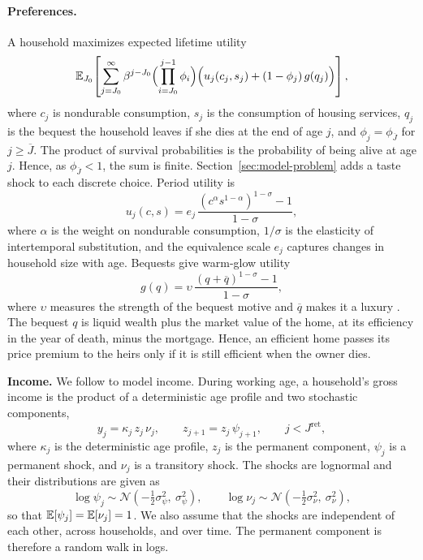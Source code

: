 \paragraph{Preferences.}
A household maximizes expected lifetime utility
\begin{equation}
  \mathbb E_{J_0}\!\left[\sum_{j=J_0}^{\infty}\beta^{j-J_0}
    \Bigl(\prod_{i=J_0}^{j-1}\phi_i\Bigr)
    \Bigl(u_j(c_j,s_j)+(1-\phi_j)\,g(q_j)\Bigr)\right],
  \label{eq:lifetime-utility}
\end{equation}
where $c_j$ is nondurable consumption, $s_j$ is the consumption of housing
services, $q_j$ is the bequest the household leaves if she dies at the end
of age $j$, and $\phi_j=\phi_{\overline J}$ for $j\geq \overline J$.  The product of survival
probabilities is the probability of being alive at age $j$. Hence, as
$\phi_{\overline J}<1$, the sum is finite. Section~\ref{sec:model-problem} adds
a taste shock to each discrete choice. Period utility is
\begin{equation}
  u_j(c,s)=e_j\,\frac{\left(c^{\alpha}s^{1-\alpha}\right)^{1-\sigma}-1}{1-\sigma},
  \label{eq:utility}
\end{equation}
where $\alpha$ is the weight on nondurable consumption, $1/\sigma$ is the
elasticity of intertemporal substitution, and the equivalence scale $e_j$
captures changes in household size with age. Bequests give warm-glow
utility
\begin{equation}
  g(q)=\upsilon\,\frac{(q+\overline q)^{1-\sigma}-1}{1-\sigma},
  \label{eq:bequest}
\end{equation}
where $\upsilon$ measures the strength of the bequest motive and $\overline q$
makes it a luxury \citep{denardi2004wealth,denardi2010elderly}. The bequest $q$ is liquid wealth plus the market value of
the home, at its efficiency in the year of death, minus the mortgage. Hence, an
efficient home  passes its price premium to the heirs only if it is
still efficient when the owner dies.



\noindent\textbf{Income.}
We follow \citet{carroll1997nature,gourinchas2002consumption,blundell2008consumption} to model income. During working age, a household's gross income is the product of a
deterministic age profile and two stochastic components,
\begin{equation}
  y_j=\kappa_j\,z_j\,\nu_j,
  \qquad
  z_{j+1}=z_j\,\psi_{j+1},
  \qquad j<J^{\mathrm{ret}},
  \label{eq:income}
\end{equation}
where $\kappa_j$ is the deterministic age profile, $z_j$ is the permanent component,
$\psi_{j}$ is a permanent shock, and $\nu_j$ is a transitory shock. The
shocks are lognormal and their distributions are given as
\begin{equation}
  \log\psi_j\sim\mathcal N\!\left(-\tfrac12\sigma_\psi^2,\ \sigma_\psi^2\right),
  \qquad
  \log\nu_j\sim\mathcal N\!\left(-\tfrac12\sigma_\nu^2,\ \sigma_\nu^2\right),
  \label{eq:income-shocks}
\end{equation}
so that $\mathbb E[\psi_j]=\mathbb E[\nu_j]=1$. We also assume that the shocks are independent of each other,
across households, and over time. The permanent component is therefore a
random walk in logs. 



